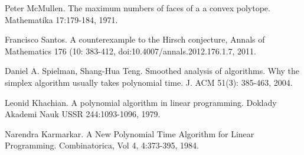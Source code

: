 \documentclass[11pt]{article}
\begin{document}
\begin{thebibliography}{1}

Peter McMullen. The maximum numbers of faces
of a a convex polytope. Mathematika 17:179-184, 1971.

Francisco Santos. A counterexample to the Hirsch
conjecture, Annals of Mathematics 176 (10: 383-412, doi:10.4007/annals.2012.176.1.7,
2011.

Daniel A. Spielman, Shang-Hua Teng. Smoothed
analysis of algorithms. Why the simplex algorithm usually takes polynomial
time. J. ACM 51(3): 385-463, 2004.

Leonid Khachian. A polynomial algorithm in linear
programming. Doklady Akademi Nauk USSR 244:1093-1096, 1979.

Narendra Karmarkar. A New Polynomial Time Algorithm
for Linear Programming. Combinatorica, Vol 4, 4:373-395, 1984.


\end{thebibliography}
\end{document}
